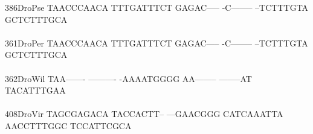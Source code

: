 \documentclass[11pt,twoside,reqno,a4paper]{article}
\begin{document}
{386\hspace*{1\charwidth}DroPse	TAACCCAACA	TTTGATTTCT	GAGAC-----	-C--------	--TCTTTGTA	GCTCTTTGCA	\\
\hspace*{4\charwidth}\hspace*{7\charwidth}\hspace*{1\charwidth}\hspace*{1\charwidth}\hspace*{1\charwidth}\hspace*{1\charwidth}\hspace*{1\charwidth}\hspace*{1\charwidth}\\
361\hspace*{1\charwidth}DroPer	TAACCCAACA	TTTGATTTCT	GAGAC-----	-C--------	--TCTTTGTA	GCTCTTTGCA	\\
\hspace*{4\charwidth}\hspace*{7\charwidth}\hspace*{1\charwidth}\hspace*{1\charwidth}\hspace*{1\charwidth}\hspace*{1\charwidth}\hspace*{1\charwidth}\hspace*{1\charwidth}\\
362\hspace*{1\charwidth}DroWil	TAA-------	----------	-AAAATGGGG	AA--------	--------AT	TACATTTGAA	\\
\hspace*{4\charwidth}\hspace*{7\charwidth}\hspace*{1\charwidth}\hspace*{1\charwidth}\hspace*{1\charwidth}\hspace*{1\charwidth}\hspace*{1\charwidth}\hspace*{1\charwidth}\\
408\hspace*{1\charwidth}DroVir	TAGCGAGACA	TACCACTT--	---GAACGGG	CATCAAATTA	AACCTTTGGC	TCCATTCGCA	\\
\hspace*{4\charwidth}\hspace*{7\charwidth}\hspace*{1\charwidth}\hspace*{1\charwidth}\hspace*{1\charwidth}\hspace*{1\charwidth}\hspace*{1\charwidth}\hspace*{1\charwidth}\\
}
\end{document}
